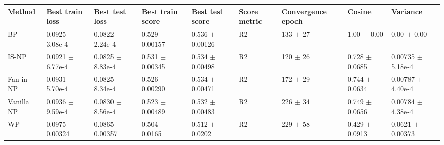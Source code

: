 \begin{tabular}{lllllllll}
\toprule
Method & Best train loss & Best test loss & Best train score & Best test score & Score metric & Convergence epoch & Cosine & Variance \\
\midrule
BP & 0.0925 $\pm$ 3.08e-4 & 0.0822 $\pm$ 2.24e-4 & 0.529 $\pm$ 0.00157 & 0.536 $\pm$ 0.00126 & R2 & 133 $\pm$ 27 & 1.00 $\pm$ 0.00 & 0.00 $\pm$ 0.00 \\
IS-NP & 0.0921 $\pm$ 6.77e-4 & 0.0825 $\pm$ 8.83e-4 & 0.531 $\pm$ 0.00345 & 0.534 $\pm$ 0.00498 & R2 & 120 $\pm$ 26 & 0.728 $\pm$ 0.0685 & 0.00735 $\pm$ 5.18e-4 \\
Fan-in NP & 0.0931 $\pm$ 5.70e-4 & 0.0825 $\pm$ 8.34e-4 & 0.526 $\pm$ 0.00290 & 0.534 $\pm$ 0.00471 & R2 & 172 $\pm$ 29 & 0.744 $\pm$ 0.0634 & 0.00787 $\pm$ 4.40e-4 \\
Vanilla NP & 0.0936 $\pm$ 9.59e-4 & 0.0830 $\pm$ 8.56e-4 & 0.523 $\pm$ 0.00489 & 0.532 $\pm$ 0.00483 & R2 & 226 $\pm$ 34 & 0.749 $\pm$ 0.0656 & 0.00784 $\pm$ 4.38e-4 \\
WP & 0.0975 $\pm$ 0.00324 & 0.0865 $\pm$ 0.00357 & 0.504 $\pm$ 0.0165 & 0.512 $\pm$ 0.0202 & R2 & 229 $\pm$ 58 & 0.429 $\pm$ 0.0913 & 0.0621 $\pm$ 0.00373 \\
\bottomrule
\end{tabular}
